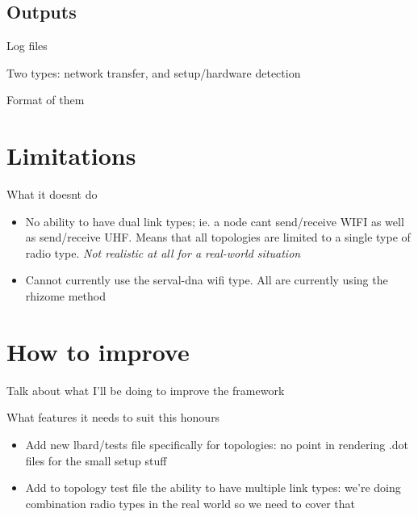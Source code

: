 \subsection{Outputs}
Log files

Two types: network transfer, and setup/hardware detection


Format of them



\section{Limitations}
What it doesnt do
\begin{itemize}
    \item No ability to have dual link types; ie. a node cant send/receive WIFI as well as send/receive UHF. Means that all topologies are limited to a single type of radio type. \emph{Not realistic at all for a real-world situation}
    \item Cannot currently use the serval-dna wifi type. All are currently using the rhizome method
\end{itemize}

\section{How to improve}
Talk about what I'll be doing to improve the framework

What features it needs to suit this honours


\begin{itemize}
    \item Add new lbard/tests file specifically for topologies: no point in rendering .dot files for the small setup stuff
    \item Add to topology test file the ability to have multiple link types: we're doing combination radio types in the real world so we need to cover that
\end{itemize}
